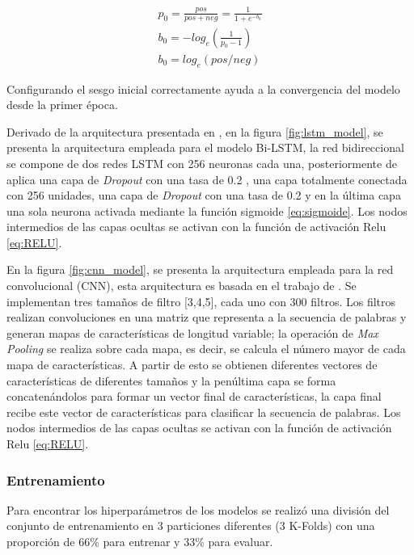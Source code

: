 \begin{equation}
\label{eq:bias}
\begin{split}
    p_0= \frac{pos}{pos+neg}= \frac{1}{1+e^{-b_0}}\\
    b_0=-log_e(\frac{1}{p_0-1})\\
    b_0=log_e(pos/neg)
\end{split}
\end{equation}

Configurando el sesgo inicial correctamente ayuda a la convergencia del modelo desde la primer época.

Derivado de la arquitectura presentada en  \cite{adhikari2019rethinking}, en la figura  \ref{fig:lstm_model}, se presenta la arquitectura empleada para el modelo Bi-LSTM, la red bidireccional se compone de dos redes LSTM con 256 neuronas cada una, posteriormente de aplica una capa de \textit{Dropout} con una tasa de 0.2 , una capa totalmente conectada con 256 unidades, una capa de \textit{Dropout} con una tasa de 0.2 y en la última capa una sola neurona activada mediante la función sigmoide \ref{eq:sigmoide}. Los nodos intermedios de las capas ocultas se activan con la función de activación Relu \ref{eq:RELU}. 


En la figura \ref{fig:cnn_model}, se presenta la arquitectura empleada para la red convolucional (CNN), esta arquitectura es basada en el trabajo de \cite{kim2014convolutional}. Se implementan tres tamaños de filtro [3,4,5], cada uno con 300 filtros. Los filtros realizan convoluciones en una matriz que representa a la secuencia de palabras y generan mapas de características de longitud variable; la operación de \textit{Max Pooling }se realiza sobre cada mapa, es decir, se calcula el número mayor de cada mapa de características. A partir de esto se obtienen diferentes vectores de características de diferentes tamaños y la penúltima capa se forma concatenándolos para formar un vector final de características, la capa final recibe este vector de características para clasificar la secuencia de palabras. Los nodos intermedios de las capas ocultas se activan con la función de activación Relu \ref{eq:RELU}. 



\subsubsection{Entrenamiento}
Para encontrar los hiperparámetros de los modelos se realizó una división del conjunto de entrenamiento en 3 particiones diferentes (3 K-Folds) con una proporción de 66\% para entrenar y 33\% para evaluar.

